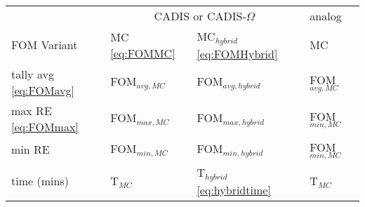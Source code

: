 \begin{tabular}{l|m{3.5cm}m{3.5cm}m{3.5cm}}
\toprule
{} &   \multicolumn{2}{c}{CADIS or CADIS-$\Omega$}   & analog \\
{FOM Variant} &   MC \eqref{eq:FOMMC} & MC$_{hybrid}$ \eqref{eq:FOMHybrid} &  MC \\
\midrule
tally avg \eqref{eq:FOMavg}  &  FOM$_{avg,MC}$ &   FOM$_{avg,hybrid}$   & FOM$_{avg,MC}$   \\
max RE  \eqref{eq:FOMmax}    &  FOM$_{max,MC}$  &   FOM$_{max,hybrid}$  &  FOM$_{min,MC}$ \\
min RE      &   FOM$_{min,MC}$  &   FOM$_{min,hybrid}$   &  FOM$_{min,MC}$ \\
time (mins) & T$_{MC}$ & T$_{hybrid}$ \eqref{eq:hybridtime} &  T$_{MC}$ \\
\bottomrule
\end{tabular}
